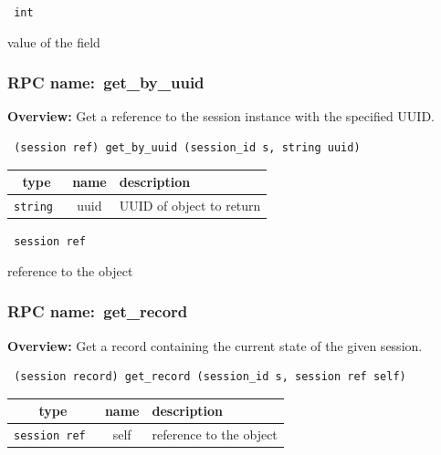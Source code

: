 \vspace{0.3cm}

{\tt 
int
}


value of the field
\vspace{0.3cm}
\vspace{0.3cm}
\vspace{0.3cm}
\subsubsection{RPC name:~get\_by\_uuid}

{\bf Overview:} 
Get a reference to the session instance with the specified UUID.

\begin{verbatim} (session ref) get_by_uuid (session_id s, string uuid)\end{verbatim}



 
\vspace{0.3cm}
\begin{tabular}{|c|c|p{7cm}|}
 \hline
{\bf type} & {\bf name} & {\bf description} \\ \hline
{\tt string } & uuid & UUID of object to return \\ \hline 

\end{tabular}

\vspace{0.3cm}

{\tt 
session ref
}


reference to the object
\vspace{0.3cm}
\vspace{0.3cm}
\vspace{0.3cm}
\subsubsection{RPC name:~get\_record}

{\bf Overview:} 
Get a record containing the current state of the given session.

\begin{verbatim} (session record) get_record (session_id s, session ref self)\end{verbatim}



 
\vspace{0.3cm}
\begin{tabular}{|c|c|p{7cm}|}
 \hline
{\bf type} & {\bf name} & {\bf description} \\ \hline
{\tt session ref } & self & reference to the object \\ \hline 

\end{tabular}

